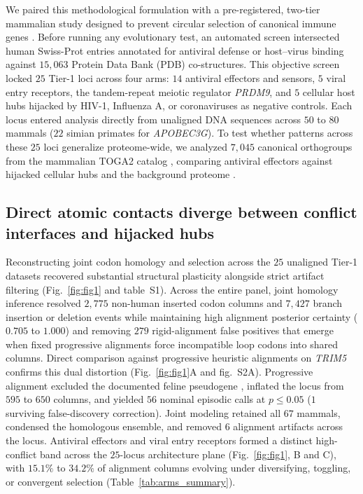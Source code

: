 \documentclass[12pt]{article}
\begin{document}
We paired this methodological formulation with a pre-registered, two-tier mammalian study designed to prevent circular selection of canonical immune genes \cite{methods}. Before running any evolutionary test, an automated screen intersected human Swiss-Prot entries annotated for antiviral defense or host--virus binding against $15,063$ Protein Data Bank (PDB) co-structures. This objective screen locked $25$ Tier-1 loci across four arms: $14$ antiviral effectors and sensors, $5$ viral entry receptors, the tandem-repeat meiotic regulator \textit{PRDM9}, and $5$ cellular host hubs hijacked by HIV-1, Influenza A, or coronaviruses as negative controls. Each locus entered analysis directly from unaligned DNA sequences across $50$ to $80$ mammals ($22$ simian primates for \textit{APOBEC3G}). To test whether patterns across these $25$ loci generalize proteome-wide, we analyzed $7,045$ canonical orthogroups from the mammalian TOGA2 catalog \cite{kirilenko2023integrating}, comparing antiviral effectors against hijacked cellular hubs and the background proteome \cite{methods}.

\subsection*{Direct atomic contacts diverge between conflict interfaces and hijacked hubs}

Reconstructing joint codon homology and selection across the $25$ unaligned Tier-1 datasets recovered substantial structural plasticity alongside strict artifact filtering (Fig.~\ref{fig:fig1} and table~S1). Across the entire panel, joint homology inference resolved $2,775$ non-human inserted codon columns and $7,427$ branch insertion or deletion events while maintaining high alignment posterior certainty ($0.705$ to $1.000$) and removing $279$ rigid-alignment false positives that emerge when fixed progressive alignments force incompatible loop codons into shared columns. Direct comparison against progressive heuristic alignments on \textit{TRIM5} confirms this dual distortion (Fig.~\ref{fig:fig1}A and fig.~S2A). Progressive alignment excluded the documented feline pseudogene \cite{mcewan2009truncated}, inflated the locus from $595$ to $650$ columns, and yielded $56$ nominal episodic calls at $p \le 0.05$ ($1$ surviving false-discovery correction). Joint modeling retained all $67$ mammals, condensed the homologous ensemble, and removed $6$ alignment artifacts across the locus. Antiviral effectors and viral entry receptors formed a distinct high-conflict band across the $25$-locus architecture plane (Fig.~\ref{fig:fig1}, B and C), with $15.1\%$ to $34.2\%$ of alignment columns evolving under diversifying, toggling, or convergent selection (Table~\ref{tab:arms_summary}).
\end{document}
